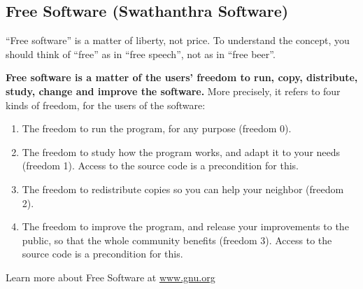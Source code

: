 \begin{english}
\section*{Free Software (Swathanthra Software)}

“Free software” is a matter of liberty, not price. To understand the concept, you should think of “free” as in “free speech”, not as in “free beer”.

\textbf{Free software is a matter of the users' freedom to run, copy, distribute, study, change and improve the software.} More precisely, it refers to four kinds of freedom, for the users of the software:
\begin{enumerate}
 \itemsep0em
 \item The freedom to run the program, for any purpose (freedom 0).
 \item The freedom to study how the program works, and adapt it to your needs (freedom 1). Access to the source code is a precondition for this.
 \item The freedom to redistribute copies so you can help your neighbor (freedom 2).
 \item The freedom to improve the program, and release your improvements to the public, so that the whole community benefits (freedom 3). Access to the source code is a precondition for this.
\end{enumerate}

Learn more about Free Software at \url{www.gnu.org}
\end{english}
